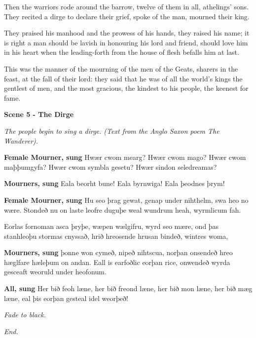 \documentclass[a4paper]{article}
\begin{document}
{Then the warriors rode around the barrow,
twelve of them in all, athelings’ sons.
They recited a dirge to declare their grief,
spoke of the man, mourned their king.

They praised his manhood and the prowess of his hands,
they raised his name; it is right a man
should be lavish in honouring his lord and friend,
should love him in his heart when the leading-forth
from the house of flesh befalls him at last.

This was the manner of the mourning of the men of the Geats,
sharers in the feast, at the fall of their lord:
they said that he was of all the world’s kings
the gentlest of men, and the most gracious,
the kindest to his people, the keenest for fame.

\newpage

\centerline{\textbf{Scene 5 - The Dirge}}
\centerline{\textit{The people begin to sing a dirge. (Text from the Anglo Saxon poem The Wanderer).}}

\textbf{Female Mourner, sung} 
Hwær cwom mearg? Hwær cwom mago?
Hwær cwom maþþumgyfa?
Hwær cwom symbla gesetu?
Hwær sindon seledreamas?

\textbf{Mourners, sung} 
Eala beorht bune!
Eala byrnwiga!
Eala þeodnes þrym!

\textbf{Female Mourner, sung} 
Hu seo þrag gewat,
genap under nihthelm,
swa heo no wære.
Stondeð nu on laste
leofre duguþe
weal wundrum heah,
wyrmlicum fah.

Eorlas fornoman
asca þryþe,
wæpen wælgifru,
wyrd seo mære,
ond þas stanhleoþu
stormas cnyssað,
hrið hreosende
hrusan bindeð,
wintres woma,

\textbf{Mourners, sung} 
þonne won cymeð,
nipeð nihtscua,
norþan onsendeð
hreo hæglfare 
hæleþum on andan.
Eall is earfoðlic
eorþan rice,
onwendeð wyrda gesceaft
weoruld under heofonum.

\textbf{All, sung} 
Her bið feoh læne,
her bið freond læne,
her bið mon læne,
her bið mæg læne,
eal þis eorþan gesteal
idel weorþeð!

\centerline{\textit{Fade to black.}}
\centerline{\textit{End.}}

}
\end{document}
